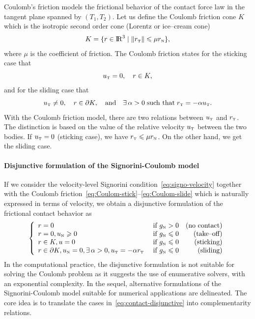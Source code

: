 {Coulomb's friction  models the frictional behavior of the contact force law in the tangent plane { spanned by $(T_1,T_2)$}. Let us define the Coulomb friction  cone $K$ which is the isotropic second order cone (Lorentz or ice--cream cone)
\begin{equation}
  \label{eq:CoulombCone}
  K = \{r \in \RR^3 \mid \|r_\t\| \leq \mu r_\n\},
\end{equation}
where $\mu$ is the coefficient of friction. The Coulomb friction  states for the sticking case that 
\begin{equation}
  \label{eq:Coulom-stick}
  u_{\t} =0,\quad r \in K,
\end{equation}
and for the sliding case that
\begin{equation}
  \label{eq:Coulom-slide}
  u_{\t}  \neq 0,\quad r \in \partial K, \quad\text{and}\quad\exists\, \alpha > 0\;\text{such that}\; r_\t = -\alpha u_\t.
\end{equation}
With the Coulomb friction model, there are two relations between $u_{\hbox{\tiny{T}}}$ and $r_{\hbox{\tiny{T}}}$. The distinction is based on the value of the relative velocity $u_{\hbox{\tiny{T}}}$ between the two bodies. If $u_{\hbox{\tiny{T}}}=0$ (sticking case), we have $r_{\hbox{\tiny{T}}} \leqslant \mu r_{\hbox{\tiny{N}}}$. On the other hand, we get the sliding case.

\paragraph{Disjunctive formulation of the Signorini-Coulomb model}

If we consider the velocity-level Signorini condition~\eqref{eq:signo-velocity} together with the Coulomb friction~\eqref{eq:Coulom-stick}--\eqref{eq:Coulom-slide} which is naturally expressed in terms of velocity, we obtain a disjunctive formulation of the frictional contact behavior as
\begin{equation}
  \label{eq:contact-disjunctive}
  \left\{\begin{array}{llr}
      r = 0  &\text{ if } g_{\n} > 0  & \text{(no contact)}\\
      r = 0,  u_\n \geq 0   &\text{ if } g_{\n} \leq 0 & \text{(take--off)} \\
      r \in K, u =0 &\text{ if } g_{\n} \leq 0 & \text{(sticking)}  \\
      r \in \partial K,u _\n=0,  \exists\,\alpha > 0, u_\t = -\alpha r_\t &\text{ if } g_{\n} \leq 0 & \text{(sliding)}  \\
\end{array}\right.
\end{equation}
In the computational practice, the disjunctive formulation is not suitable for  solving the Coulomb problem as it suggests the use of enumerative solvers, with an exponential complexity.
In the sequel, alternative formulations of the Signorini-Coulomb model suitable for numerical applications are delineated.
The core idea is to translate the cases in~\eqref{eq:contact-disjunctive} into complementarity relations.

}
